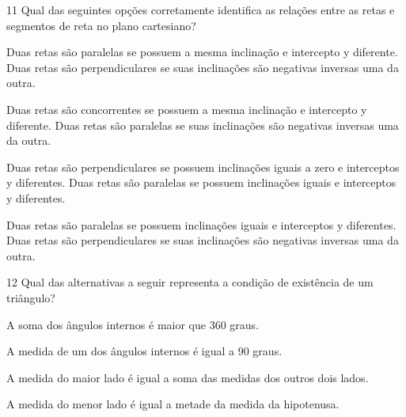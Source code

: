 

\num{11} Qual das seguintes opções corretamente identifica as relações entre
as retas e segmentos de reta no plano cartesiano?

\begin{escolha}
\item Duas retas são paralelas se possuem a mesma inclinação e intercepto y
diferente. Duas retas são perpendiculares se suas inclinações são
negativas inversas uma da outra.
\item Duas retas são concorrentes se possuem a mesma inclinação e
intercepto y diferente. Duas retas são paralelas se suas inclinações são
negativas inversas uma da outra.
\item Duas retas são perpendiculares se possuem inclinações iguais a zero e
interceptos y diferentes. Duas retas são paralelas se possuem
inclinações iguais e interceptos y diferentes.
\item Duas retas são paralelas se possuem inclinações iguais e interceptos
y diferentes. Duas retas são perpendiculares se suas inclinações são
negativas inversas uma da outra.
\end{escolha}







\num{12} Qual das alternativas a seguir representa a condição de existência de
um triângulo?

\begin{escolha}
\item A soma dos ângulos internos é maior que 360 graus.
\item A medida de um dos ângulos internos é igual a 90 graus.
\item A medida do maior lado é igual a soma das medidas dos outros dois
lados.
\item A medida do menor lado é igual a metade da medida da hipotenusa.
\end{escolha}

